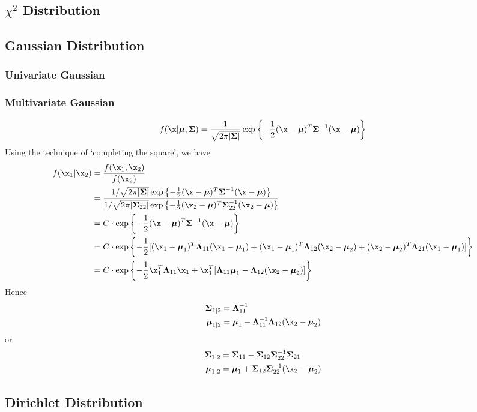 \subsection{$\chi^2$ Distribution}

\subsection{Gaussian Distribution}
\subsubsection{Univariate Gaussian}
\subsubsection{Multivariate Gaussian}
\begin{align}
	f(\x|\bmu,\bSigma) = \frac{1}{\sqrt{2\pi|\bSigma|}} \exp\left\{-\frac{1}{2}(\x-\bmu)^T\bSigma^{-1}(\x-\bmu)\right\}
\end{align}
Using the technique of `completing the square', we have
\begin{align}
	f(\x_1|\x_2) &= \frac{f(\x_1,\x_2)}{f(\x_2)}\\
	&= \frac{1/\sqrt{2\pi|\bSigma|}\exp\left\{-\frac{1}{2}(\x-\bmu)^T\bSigma^{-1}(\x-\bmu)\right\}}{1/\sqrt{2\pi|\bSigma_{22}|}\exp\left\{-\frac{1}{2}(\x_2-\bmu)^T\bSigma_{22}^{-1}(\x_2-\bmu)\right\}}\\
	&= C \cdot \exp\left\{-\frac{1}{2}(\x-\bmu)^T\bSigma^{-1}(\x-\bmu)\right\}\\
	&= C \cdot \exp\left\{-\frac{1}{2}[(\x_1-\bmu_1)^T\bLambda_{11}(\x_1-\bmu_1)+(\x_1-\bmu_1)^T\bLambda_{12}(\x_2-\bmu_2)+(\x_2-\bmu_2)^T\bLambda_{21}(\x_1-\bmu_1)]\right\}\\
	&= C \cdot \exp\left\{-\frac{1}{2}\x_1^T\bLambda_{11}\x_1 + \x_1^T[\bLambda_{11}\bmu_1 - \bLambda_{12}(\x_2-\bmu_2)]\right\}	
\end{align}
Hence
\begin{align}
	\bSigma_{1|2} &= \bLambda_{11}^{-1}\\
	\bmu_{1|2} &= \bmu_1 - \bLambda_{11}^{-1}\bLambda_{12}(\x_2-\bmu_2)
\end{align}
or
\begin{align}
	\bSigma_{1|2} &= \bSigma_{11} - \bSigma_{12}\bSigma_{22}^{-1}\bSigma_{21}\\
	\bmu_{1|2} &= \bmu_1 + \bSigma_{12}\bSigma_{22}^{-1}(\x_2-\bmu_2)
\end{align}

\subsection{Dirichlet Distribution}
